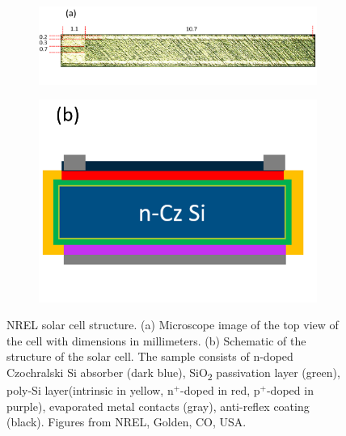\documentclass[a4paper]{book}
\newcommand{\tsub}{\textsubscript}
\begin{document}
	\begin{figure}[b]
		\centering
		\begin{subfigure}{.65\textwidth}
			\centering
			\includegraphics[width=\textwidth]{images/3_minicell_microscope.png}
		\end{subfigure}%
		\begin{subfigure}{.35\textwidth}
			\centering
			\includegraphics[width=.95\textwidth]{images/3_minicells.png}
		\end{subfigure}
		\caption{NREL solar cell structure. (a) Microscope image of the top view of the cell with dimensions in millimeters. (b) Schematic of the structure of the solar cell. The sample consists of n-doped Czochralski Si absorber (dark blue), SiO\tsub 2 passivation layer (green), poly-Si layer(intrinsic in yellow, n$^+$-doped in red, p$^+$-doped in purple), evaporated metal contacts (gray), anti-reflex coating (black). Figures from NREL, Golden, CO, USA.}
		\label{fig:3_minicells}
	\end{figure}
	
\end{document}

